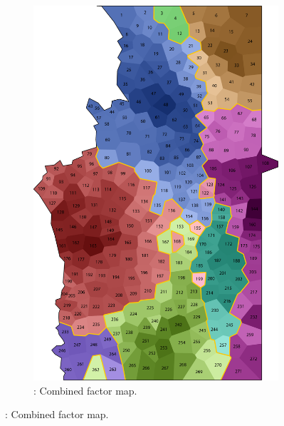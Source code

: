 \documentclass[output=paper]{LSP/langsci}
\begin{document}
\begin{figure}
\begin{subfigure}[t]{0.3\textwidth}
\includegraphics[width=\textwidth]{illustrations/pickl_fig11}
\caption{: Combined factor map.}
\label{fig:pickl:11}
\end{subfigure}
\end{figure}
\end{document}
